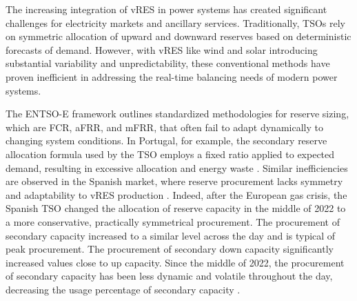 The increasing integration of \gls{vRES} in power systems has created significant challenges for electricity markets and ancillary services. Traditionally, \gls{TSO}s rely on symmetric allocation of upward and downward reserves based on deterministic forecasts of demand. However, with \gls{vRES} like wind and solar introducing substantial variability and unpredictability, these conventional methods have proven inefficient in addressing the real-time balancing needs of modern power systems.\par
The \gls{ENTSO-E} framework \cite{handbook2009policy} outlines standardized methodologies for reserve sizing, which are \gls{FCR}, \gls{aFRR}, and \gls{mFRR}, that often fail to adapt dynamically to changing system conditions. In Portugal, for example, the secondary reserve allocation formula used by the \gls{TSO} employs a fixed ratio applied to expected demand, resulting in excessive allocation and energy waste \cite{Frade:19c,Perissi2022}. Similar inefficiencies are observed in the Spanish market, where reserve procurement lacks symmetry and adaptability to \gls{vRES} production \cite{Algarvio:24,Cardo-Miota:23}.
%
\textcolor[rgb]{0,0.25,0.25}{Indeed, after the European gas crisis, the Spanish TSO changed the allocation of reserve capacity in the middle of 2022 to a more conservative, practically symmetrical procurement. The procurement of secondary capacity increased to a similar level across the day and is typical of peak procurement. The procurement of secondary down capacity significantly increased values close to up capacity. Since the middle of 2022, the procurement of secondary capacity has been less dynamic and volatile throughout the day, decreasing the usage percentage of secondary capacity \cite{Algarvio:24,Cardo-Miota:23}.}
%

